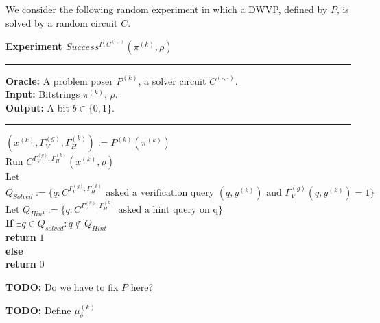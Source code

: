 %
We consider the following random experiment in which a DWVP, defined by $P$, is solved by a random circuit $C$.
\begin{codeblock}
  \textbf{Experiment $Success^{P, C^{(\cdot, \cdot)}}(\pi^{(k)}, \rho)$}
  \medskip
  \hrule
  \medskip
  \textbf{Oracle:} A problem poser $P^{(k)}$, a solver circuit $C^{(\cdot,\cdot)}$.\\
  \textbf{Input:}  Bitstrings $\pi^{(k)}$, $\rho$.\\
  \textbf{Output:} A bit $b \in \{0,1\}$.
  \medskip\hrule\medskip
  $(x^{(k)}, \Gamma_V^{(g)}, \Gamma_H^{(k)}) := P^{(k)}(\pi^{(k)})$ \\
  Run $C^{\Gamma_V^{(g)},\Gamma_H^{(k)}}(x^{(k)}, \rho)$ \\
  \IndI Let $Q_{Solved} := \{q: \text{$C^{\Gamma_V^{(g)}, \Gamma_H^{(k)}}$ asked a verification query $(q,y^{(k)})$ and $\Gamma_V^{(g)}(q, y^{(k)}) = 1$} \}$\\
  \IndI Let $Q_{Hint} := \{q: \text{$C^{\Gamma_V^{(g)}, \Gamma_H^{(k)}}$ asked a hint query on q} \}$\\
  \textbf{If} $\exists q \in Q_{solved} : q \notin Q_{Hint}$ \then \\
  \IndI \textbf{return} $1$\\
  \textbf{else} \\
  \IndI \textbf{return} $0$\\
\end{codeblock}
%
\begin{todo}
  \textbf{TODO:} Do we have to fix $P$ here?
\end{todo}
\begin{todo}
  \textbf{TODO:} Define $\mu_{\delta}^{(k)}$
\end{todo}
%
